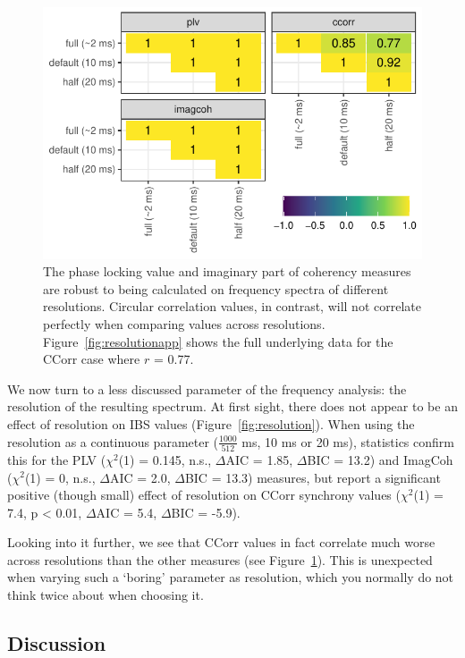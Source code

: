 \begin{figure}[!htpb]
  \includegraphics[width=\linewidth]{../stats/results/resolutioncorr.pdf}
  \caption{The phase locking value and imaginary part of coherency measures are robust to being calculated on frequency spectra of different resolutions. Circular correlation values, in contrast, will not correlate perfectly when comparing values across resolutions. Figure~\ref{fig:resolutionapp} shows the full underlying data for the CCorr case where $r$ = 0.77.}
  \label{fig:resolutioncorr}
\end{figure}

We now turn to a less discussed parameter of the frequency analysis: the
resolution of the resulting spectrum. At first sight, there does not appear to
be an effect of resolution on IBS values (Figure~\ref{fig:resolution}). When
using the resolution as a continuous parameter ($\frac{1000}{512}$ ms, 10 ms or
20 ms), statistics confirm this for the PLV ($\chi^2$(1) = 0.145, n.s.,
$\Delta$AIC = 1.85, $\Delta$BIC = 13.2) and ImagCoh ($\chi^2$(1) = 0, n.s.,
$\Delta$AIC = 2.0, $\Delta$BIC = 13.3) measures, but report a significant
positive (though small) effect of resolution on CCorr synchrony values
($\chi^2$(1) = 7.4, p < 0.01, $\Delta$AIC = 5.4, $\Delta$BIC = -5.9).

Looking into it further, we see that CCorr values in fact
correlate much worse across resolutions than the other measures
(see Figure~\ref{fig:resolutioncorr}). This is unexpected when varying such a
`boring' parameter as resolution, which you normally do not think twice about
when choosing it.


\subsection{Discussion}


